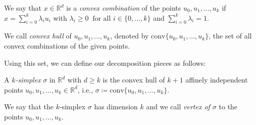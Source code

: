 \documentclass[../main.tex]{subfiles}
\begin{document}
\begin{definition}
\begin{sloppypar}
We say that $x \in \mathbb{R}^d$ is a \emph{convex combination} of the points ${u_0, u_1, ..., u_k}$ if $x = \sum_{i=0}^{k} \lambda_i u_i$ with $\lambda_i \geq 0 \ \text{ for all } i \in \{0,...,k\}$ and $\sum_{i=0}^{k} \lambda_i = 1$.
\end{sloppypar}
\end{definition}

\begin{definition}
\begin{sloppypar}
We call \emph{convex hull} of $u_0, u_1, ..., u_k$, denoted by ${\text{conv}\{u_0, u_1, ..., u_k\}}$, the set of all convex combinations of the given points.
\end{sloppypar}
\end{definition}
Using this set, we can define our decomposition pieces as follows:

\begin{definition}
A \emph{$k$-simplex} $\sigma$ in $\mathbb{R}^d$ with $d \geq k$ is the convex hull of $k+1$ affinely independent points $u_0, u_1, ..., u_k \in \mathbb{R}^d$, i.e.,
$\sigma \coloneqq \text{conv}\{u_0, u_1, ..., u_k\}$.
\end{definition}

We say that the $k$-simplex $\sigma$ has dimension $k$ and we call \emph{vertex of $\sigma$} to the points $u_0, u_1, ..., u_k$.
\end{document}
